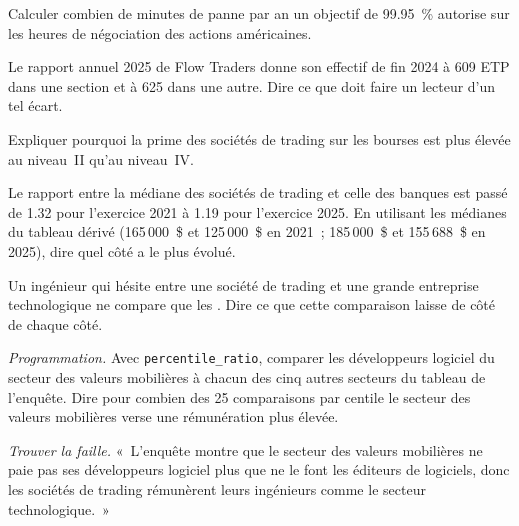 \begin{exercise}[$\star$]\label{exo:in:software-engineer:2}
Calculer combien de minutes de panne par an un objectif de 99.95~\% autorise sur les heures de négociation des actions américaines.
\end{exercise}

\begin{exercise}[$\star$]\label{exo:in:software-engineer:3}
Le rapport annuel 2025 de Flow Traders donne son effectif de fin 2024 à 609 ETP dans une section et à 625 dans une autre. Dire ce que doit faire
un lecteur d'un tel écart.
\end{exercise}

\begin{exercise}[$\star\star$]\label{exo:in:software-engineer:4}
Expliquer pourquoi la prime des sociétés de trading sur les bourses est plus élevée au niveau~II qu'au niveau~IV.
\end{exercise}

\begin{exercise}[$\star\star$]\label{exo:in:software-engineer:5}
Le rapport entre la médiane des sociétés de trading et celle des banques est passé de 1.32 pour l'exercice 2021 à 1.19 pour l'exercice 2025. En utilisant les médianes du
tableau dérivé (165\,000~\$ et 125\,000~\$ en 2021~; 185\,000~\$ et 155\,688~\$ en 2025), dire quel côté a le plus évolué.
\end{exercise}

\begin{exercise}[$\star\star$]\label{exo:in:software-engineer:6}
Un ingénieur qui hésite entre une société de trading et une grande entreprise technologique ne compare que les . Dire ce que cette comparaison
laisse de côté de chaque côté.
\end{exercise}

\begin{exercise}[$\star\star\star$]\label{exo:in:software-engineer:7}
\emph{Programmation.} Avec \texttt{percentile\_ratio}, comparer les développeurs logiciel du secteur des valeurs mobilières à chacun des
cinq autres secteurs du tableau de l'enquête. Dire pour combien des 25 comparaisons par centile le secteur des valeurs mobilières
verse une rémunération plus élevée.
\end{exercise}

\begin{exercise}[$\star\star\star$]\label{exo:in:software-engineer:8}
\emph{Trouver la faille.} «~L'enquête montre que le secteur des valeurs mobilières ne paie pas ses développeurs logiciel plus que ne le font les
éditeurs de logiciels, donc les sociétés de trading rémunèrent leurs ingénieurs comme le secteur technologique.~»
\end{exercise}

